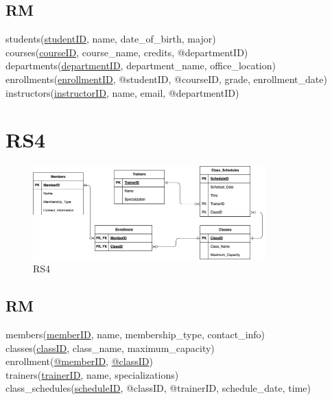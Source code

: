 \documentclass{article}
\begin{document}
\begin{CJK*}{UTF8}{gbsn}
    \subsection{RM}
    students(\underline{studentID}, name, date\_of\_birth, major)
    \\courses(\underline{courseID}, course\_name, credits, @departmentID)
    \\departments(\underline{departmentID}, department\_name, office\_location)
    \\enrollments(\underline{enrollmentID}, @studentID, @courseID, grade, enrollment\_date)
    \\instructors(\underline{instructorID}, name, email, @departmentID)

    \section{RS4}
    \begin{figure}[H]
        \centering
        \includegraphics[width=0.8\textwidth]{RS4.png}
        \caption{RS4}
    \end{figure}
    \subsection{RM}
    members(\underline{memberID}, name, membership\_type, contact\_info)
    \\classes(\underline{classID}, class\_name, maximum\_capacity)
    \\enrollment(\underline{@memberID}, \underline{@classID})
    \\trainers(\underline{trainerID}, name, specializations)
    \\class\_schedules(\underline{scheduleID}, @classID, @trainerID, schedule\_date, time)

\end{CJK*}
\end{document}
